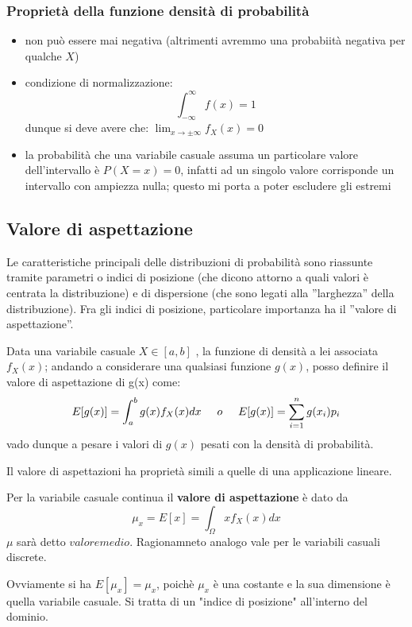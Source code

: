 \documentclass{article}
\begin{document}
\subsubsection{Proprietà della funzione densità di probabilità}
\begin{itemize}
    \item non può essere mai negativa (altrimenti avremmo una probabiità negativa per qualche $X$)
    \item condizione di normalizzazione: \[ \int_{- \infty}^{\infty} f(x)=1\]
    dunque si deve avere che: $\lim_{x \rightarrow \pm \infty} f_X(x)=0$
    \item la probabilità che una variabile casuale assuma un particolare valore dell'intervallo è $P(X=x)=0$, infatti ad un singolo valore corrisponde un intervallo con ampiezza nulla; questo mi porta a poter escludere gli estremi
\end{itemize}

\subsection{Valore di aspettazione}
Le caratteristiche principali delle distribuzioni di probabilità sono
riassunte tramite parametri o indici di posizione (che dicono attorno
a quali valori è centrata la distribuzione) e di dispersione (che sono
legati alla ''larghezza'' della distribuzione). 
Fra gli indici di posizione, particolare importanza ha il ''valore di
aspettazione''.

Data una variabile casuale $X \in [a,b]$  , la funzione di densità a lei associata $f_X(x)$;
andando a considerare una qualsiasi funzione $g(x)$, posso definire il valore di aspettazione di g(x) come:
\[
E[g(x)]= \int_{a}^{b} g(x) f_X(x) dx \hspace{0.5cm} o \hspace{0.5cm} E[g(x)]=  \sum_{i=1}^{n} g(x_i) p_i
\]
vado dunque a pesare i valori di $g(x)$ pesati con la densità di probabilità.

Il valore di aspettazioni ha proprietà simili a quelle di una applicazione lineare.

Per la variabile casuale continua il \textbf{valore di aspettazione} è dato da 
\[
\mu_x=E[x]=\int_{\Omega}^{}xf_{X}(x)dx
\]
$\mu$ sarà detto $valore medio$.
Ragionamneto analogo vale per le variabili casuali discrete.

Ovviamente si ha $E[\mu_x]=\mu_x$, poichè $\mu_x$ è una costante e la sua dimensione è quella variabile casuale.
Si tratta di un "indice di posizione" all'interno del dominio. 
\end{document}

